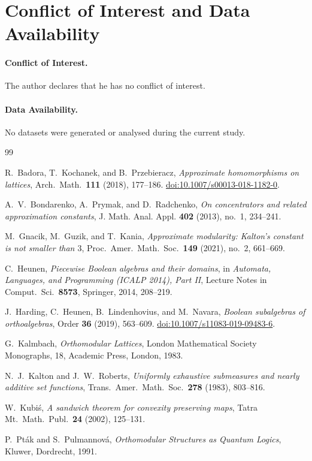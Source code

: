\documentclass[11pt]{amsart}
\theoremstyle{definition}
\begin{document}
\section*{Conflict of Interest and Data Availability}

\paragraph{Conflict of Interest.}
The author declares that he has no conflict of interest.

\paragraph{Data Availability.}
No datasets were generated or analysed during the current study.

\begin{thebibliography}{99}

R.~Badora, T.~Kochanek, and B.~Przebieracz,
\emph{Approximate homomorphisms on lattices},
Arch.\ Math.\ \textbf{111} (2018), 177--186.
\href{https://doi.org/10.1007/s00013-018-1182-0}{doi:10.1007/s00013-018-1182-0}.

A.~V.~Bondarenko, A.~Prymak, and D.~Radchenko,
\emph{On concentrators and related approximation constants},
J. Math. Anal. Appl. \textbf{402} (2013), no.~1, 234--241.

M.~Gnacik, M.~Guzik, and T.~Kania,
\emph{Approximate modularity: Kalton's constant is not smaller than $3$},
Proc.\ Amer.\ Math.\ Soc.\ \textbf{149} (2021), no.~2, 661--669.

C.~Heunen,
\emph{Piecewise Boolean algebras and their domains},
in \emph{Automata, Languages, and Programming (ICALP 2014), Part II},
Lecture Notes in Comput.\ Sci.\ \textbf{8573}, Springer, 2014, 208--219.

J.~Harding, C.~Heunen, B.~Lindenhovius, and M.~Navara,
\emph{Boolean subalgebras of orthoalgebras},
Order \textbf{36} (2019), 563--609.
\href{https://doi.org/10.1007/s11083-019-09483-6}{doi:10.1007/s11083-019-09483-6}.

G.~Kalmbach,
\emph{Orthomodular Lattices},
London Mathematical Society Monographs, 18, Academic Press, London, 1983.

N.~J.~Kalton and J.~W.~Roberts,
\emph{Uniformly exhaustive submeasures and nearly additive set functions},
Trans.\ Amer.\ Math.\ Soc.\ \textbf{278} (1983), 803--816.

W.~Kubi\'s,
\emph{A sandwich theorem for convexity preserving maps},
Tatra Mt.\ Math.\ Publ.\ \textbf{24} (2002), 125--131.

P.~Pt\'ak and S.~Pulmannov\'a,
\emph{Orthomodular Structures as Quantum Logics},
Kluwer, Dordrecht, 1991.

\end{thebibliography}
\end{document}
